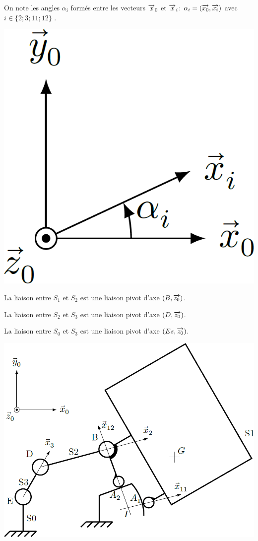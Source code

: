 \documentclass[10pt,fleqn]{article} %
\newif\ifnormal
\begin{document}
\begin{multicols}{2}
\begin{multicols}{2}
On note les angles $\alpha_i$ formés entre les vecteurs $\overrightarrow{x}_0$ et $\overrightarrow{x}_i$: $\alpha_i=\left(\overrightarrow{{x}_0},\overrightarrow{{x}_i}\right)$ avec $i\in \{2;3;11;12\}$ .


\begin{center}
\includegraphics[width=.35\linewidth]{images/fig_03}
\end{center}

La liaison entre $S_1$ et $S_2$ est une liaison pivot d’axe $\left(B,\overrightarrow{z_0}\right)$.

La liaison entre $S_2$ et $S_3$ est une liaison pivot d’axe $\left(D,\overrightarrow{z_0}\right)$.

La liaison entre $S_0$ et $S_3$ est une liaison pivot d’axe $\left(Es,\overrightarrow{z_0}\right)$.


\begin{center}
\includegraphics[width=\linewidth]{images/fig_04}
\end{center}
\fi


\ifnormal
\subparagraph{}\textit{Déterminer la forme des torseurs $\torseurstat{T}{S_0}{S_1}_1$ au point $A_1$ et $\torseurstat{T}{S_0}{S_1}_2$ au point $A_2$ des actions mécaniques des rampes du bâti $S_0$ s’appliquant sur le chariot $S_1$. Ces torseurs sont-ils des glisseurs ?}
\else
\fi



\end{multicols}
\end{multicols}
\end{document}
